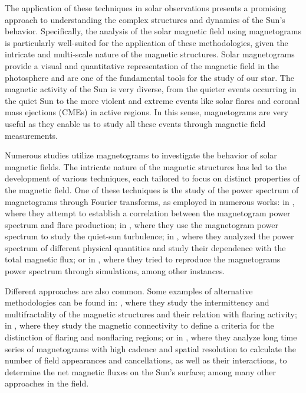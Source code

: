 The application of these techniques in solar observations presents a promising approach to understanding the complex structures and dynamics of the Sun's behavior. Specifically, the analysis of the solar magnetic field using magnetograms is particularly well-suited for the application of these methodologies, given the intricate and multi-scale nature of the magnetic structures. Solar magnetograms provide a visual and quantitative representation of the magnetic field in the photosphere and are one of the fundamental tools for the study of our star. The magnetic activity of the Sun is very diverse, from the quieter events occurring in the quiet Sun to the more violent and extreme events like solar flares and coronal mass ejections (CMEs) in active regions. In this sense, magnetograms are very useful as they enable us to study all these events through magnetic field measurements.

Numerous studies utilize magnetograms to investigate the behavior of solar magnetic fields. The intricate nature of the magnetic structures has led to the development of various techniques, each tailored to focus on distinct properties of the magnetic field. One of these techniques is the study of the power spectrum of magnetograms through Fourier transforms, as employed in numerous works: in \cite{power_spectrum1}, where they attempt to establish a correlation between the magnetogram power spectrum and flare production; in \cite{power_spectrum_2}, where they use the magnetogram power spectrum to study the quiet-sun turbulence; in \cite{power_spectrum_3}, where they analyzed the power spectrum of different physical quantities and study their dependence with the total magnetic flux; or in  \cite{power_spectrum_4}, where they tried to reproduce the magnetograms power spectrum through simulations, among other instances. 

Different approaches are also common. Some examples of alternative methodologies can be found in: \cite{intermitency}, where they study the intermittency and multifractality of the magnetic structures and their relation with flaring activity; in \cite{conectivity}, where they study the magnetic connectivity to define a criteria for the distinction of flaring and nonflaring regions; or in \cite{gosic}, where they analyze long time series of magnetograms with high cadence and spatial resolution to calculate the number of field appearances and cancellations, as well as their interactions, to determine the net magnetic fluxes on the Sun's surface; among many other approaches in the field.

